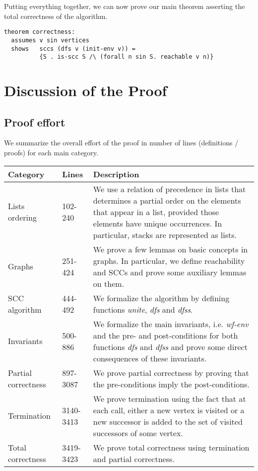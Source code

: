 \documentclass[sigplan,10pt,anonymous,review]{acmart}
\newcommand{\prog}[1]{\textit{#1}}
\begin{document}
Putting everything together, we can now prove our main theorem asserting the total correctness of the algorithm.

\begin{small}
\begin{lstlisting}[language=isabelle]
theorem correctness:
  assumes v sin vertices
  shows   sccs (dfs v (init-env v)) = 
          {S . is-scc S /\ (forall n sin S. reachable v n)}
\end{lstlisting}
\end{small}


\section{Discussion of the Proof}
\label{sec:discussion}

\subsection{Proof effort}
\label{sec:effort}

We summarize the overall effort of the proof in number of lines (definitions / proofs) for each main category.

\begin{center}
  \small
  \begin{tabular}{|M{.125\textwidth}|M{.075\textwidth}|m{.21\textwidth}|}
    \hline
    Category & Lines & Description\\
    \hline
    Lists ordering  & 102-240 & We use a relation of precedence in lists that determines a partial order on the elements that appear in a list, provided those elements have unique occurrences. In particular, stacks are represented as lists.\\
    \hline
    Graphs & 251-424 & We prove a few lemmas on basic concepts in graphs. In particular, we define reachability and SCCs and prove some auxiliary lemmas on them.\\
    \hline
    SCC algorithm & 444-492 & We formalize the algorithm by defining functions \prog{unite}, \prog{dfs} and \prog{dfss}.\\
    \hline
    Invariants & 500-886 & We formalize the main invariants, i.e. \prog{wf-env} and the pre- and post-conditions for both functions \prog{dfs} and \prog{dfss} and prove some direct consequences of these invariants.\\
    \hline
    Partial correctness & 897-3087 & We prove partial correctness by proving that the pre-conditions imply the post-conditions.\\
    \hline
    Termination & 3140-3413 & We prove termination using the fact that at each call, either a new vertex is visited or a new successor is added to the set of visited successors of some vertex.\\
    \hline
    Total correctness & 3419-3423 & We prove total correctness using termination and partial correctness.\\
    \hline
  \end{tabular}
\end{center}
\end{document}
